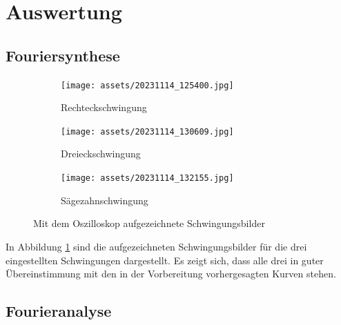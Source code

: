 
\section{Auswertung}
\subsection{Fouriersynthese}
\begin{figure}
    \begin{subfigure}{0.5\textwidth}
        \centering
        \texttt{[image: assets/20231114\_125400.jpg]}
        \caption{Rechteckschwingung}
    \end{subfigure}
    \begin{subfigure}{0.5\textwidth}
        \centering
        \texttt{[image: assets/20231114\_130609.jpg]}
        \caption{Dreieckschwingung}
    \end{subfigure}
    \begin{subfigure}{0.5\textwidth}
        \centering
        \texttt{[image: assets/20231114\_132155.jpg]}
        \caption{Sägezahnschwingung}
    \end{subfigure}
    \caption{Mit dem Oszilloskop aufgezeichnete Schwingungsbilder}
    \label{fig:oszi}
\end{figure}

In Abbildung \ref{fig:oszi} sind die aufgezeichneten Schwingungsbilder für die
drei eingestellten Schwingungen dargestellt. Es zeigt sich, dass alle drei in
guter Übereinstimmung mit den in der Vorbereitung vorhergesagten Kurven stehen.

\subsection{Fourieranalyse}
